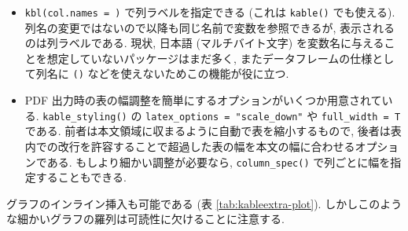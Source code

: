 \documentclass[
  xelatex,ja=standard,jafont=noto]{bxjsbook}
\providecommand{\tightlist}{%
  \setlength{\itemsep}{0pt}\setlength{\parskip}{0pt}}
\theoremstyle{definition}
\theoremstyle{definition}
\theoremstyle{definition}
\theoremstyle{definition}
\theoremstyle{remark}
\begin{document}
\begin{itemize}
\tightlist
\item
  \texttt{kbl(col.names\ =\ )} で列ラベルを指定できる (これは
  \texttt{kable()} でも使える).
  列名の変更ではないので以降も同じ名前で変数を参照できるが,
  表示されるのは列ラベルである. 現状, 日本語 (マルチバイト文字)
  を変数名に与えることを想定していないパッケージはまだ多く,
  またデータフレームの仕様として列名に \texttt{()}
  などを使えないためこの機能が役に立つ.
\item
  PDF 出力時の表の幅調整を簡単にするオプションがいくつか用意されている.
  \texttt{kable\_styling()} の \texttt{latex\_options\ =\ "scale\_down"}
  や \texttt{full\_width\ =\ T} である.
  前者は本文領域に収まるように自動で表を縮小するもので,
  後者は表内での改行を許容することで超過した表の幅を本文の幅に合わせるオプションである.
  もしより細かい調整が必要なら, \texttt{column\_spec()}
  で列ごとに幅を指定することもできる.
\end{itemize}

グラフのインライン挿入も可能である (表 \ref{tab:kableextra-plot}).
しかしこのような細かいグラフの羅列は可読性に欠けることに注意する.
\end{document}
